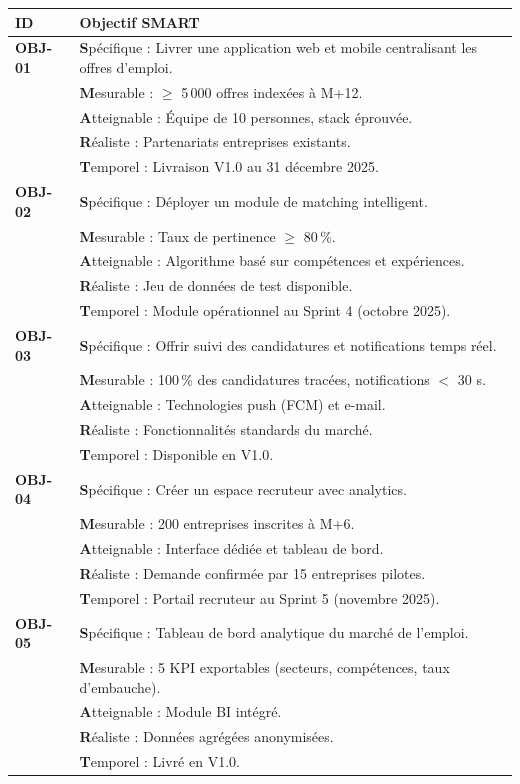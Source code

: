 \documentclass[11pt,a4paper]{article}
\begin{document}
\small
\begin{tabularx}{\textwidth}{|>{\bfseries}p{1.2cm}|X|}
    \hline
    \rowcolor{ifrigray}
    ID & Objectif SMART \\
    \hline
    OBJ-01 &
    \textbf{S}pécifique : Livrer une application web et mobile centralisant les offres d'emploi.\\
    & \textbf{M}esurable : $\geq$ 5\,000 offres indexées à M+12.\\
    & \textbf{A}tteignable : Équipe de 10 personnes, stack éprouvée.\\
    & \textbf{R}éaliste : Partenariats entreprises existants.\\
    & \textbf{T}emporel : Livraison V1.0 au 31 décembre 2025. \\
    \hline
    OBJ-02 &
    \textbf{S}pécifique : Déployer un module de matching intelligent.\\
    & \textbf{M}esurable : Taux de pertinence $\geq$ 80\,\%.\\
    & \textbf{A}tteignable : Algorithme basé sur compétences et expériences.\\
    & \textbf{R}éaliste : Jeu de données de test disponible.\\
    & \textbf{T}emporel : Module opérationnel au Sprint 4 (octobre 2025). \\
    \hline
    OBJ-03 &
    \textbf{S}pécifique : Offrir suivi des candidatures et notifications temps réel.\\
    & \textbf{M}esurable : 100\,\% des candidatures tracées, notifications $<$ 30 s.\\
    & \textbf{A}tteignable : Technologies push (FCM) et e-mail.\\
    & \textbf{R}éaliste : Fonctionnalités standards du marché.\\
    & \textbf{T}emporel : Disponible en V1.0. \\
    \hline
    OBJ-04 &
    \textbf{S}pécifique : Créer un espace recruteur avec analytics.\\
    & \textbf{M}esurable : 200 entreprises inscrites à M+6.\\
    & \textbf{A}tteignable : Interface dédiée et tableau de bord.\\
    & \textbf{R}éaliste : Demande confirmée par 15 entreprises pilotes.\\
    & \textbf{T}emporel : Portail recruteur au Sprint 5 (novembre 2025). \\
    \hline
    OBJ-05 &
    \textbf{S}pécifique : Tableau de bord analytique du marché de l'emploi.\\
    & \textbf{M}esurable : 5 KPI exportables (secteurs, compétences, taux d'embauche).\\
    & \textbf{A}tteignable : Module BI intégré.\\
    & \textbf{R}éaliste : Données agrégées anonymisées.\\
    & \textbf{T}emporel : Livré en V1.0. \\
    \hline
\end{tabularx}
\normalsize
\end{document}
